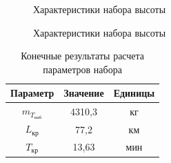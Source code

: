 \begin{figure}[H]
    \caption{Характеристики набора высоты}
    \label{fig:Характеристики набора высоты1}
\end{figure}

\begin{figure}[H]
    \caption{Характеристики набора высоты}
    \label{fig:Характеристики набора высоты2}
\end{figure}

\begin{table}[H]
    \centering
    \caption{Конечные результаты расчета параметров набора}
    \begin{tabular}{|c|c|c|}
    \hline
        Параметр & Значение &Единицы\\ \hline
        $m_{T_\text{наб}}$ & 4310,3& кг\\ \hline
        $L_\text{кр}$ & 77,2 &км\\ \hline
        $T_\text{кр}$ & 13,63& мин\\ \hline
    \end{tabular}
    \label{tab:Крейсер}
\end{table}


